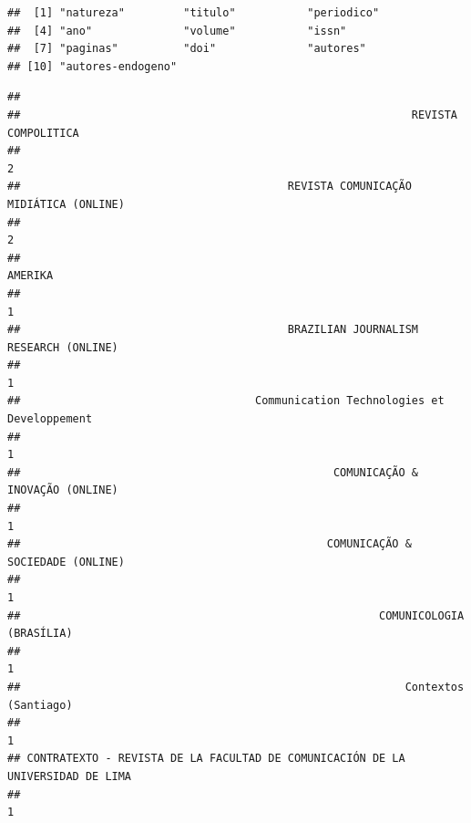 \documentclass[]{article}
\newenvironment{Shaded}{\begin{snugshade}}{\end{snugshade}}
\newcommand{\KeywordTok}[1]{\textcolor[rgb]{0.13,0.29,0.53}{\textbf{#1}}}
\newcommand{\DataTypeTok}[1]{\textcolor[rgb]{0.13,0.29,0.53}{#1}}
\newcommand{\DecValTok}[1]{\textcolor[rgb]{0.00,0.00,0.81}{#1}}
\newcommand{\StringTok}[1]{\textcolor[rgb]{0.31,0.60,0.02}{#1}}
\newcommand{\OtherTok}[1]{\textcolor[rgb]{0.56,0.35,0.01}{#1}}
\newcommand{\OperatorTok}[1]{\textcolor[rgb]{0.81,0.36,0.00}{\textbf{#1}}}
\newcommand{\NormalTok}[1]{#1}
\begin{document}
\begin{Shaded}
\end{Shaded}

\begin{verbatim}
##  [1] "natureza"         "titulo"           "periodico"       
##  [4] "ano"              "volume"           "issn"            
##  [7] "paginas"          "doi"              "autores"         
## [10] "autores-endogeno"
\end{verbatim}

\begin{Shaded}
\end{Shaded}

\begin{verbatim}
## 
##                                                            REVISTA COMPOLITICA 
##                                                                              2 
##                                         REVISTA COMUNICAÇÃO MIDIÁTICA (ONLINE) 
##                                                                              2 
##                                                                        AMERIKA 
##                                                                              1 
##                                         BRAZILIAN JOURNALISM RESEARCH (ONLINE) 
##                                                                              1 
##                                    Communication Technologies et Developpement 
##                                                                              1 
##                                                COMUNICAÇÃO & INOVAÇÃO (ONLINE) 
##                                                                              1 
##                                               COMUNICAÇÃO & SOCIEDADE (ONLINE) 
##                                                                              1 
##                                                       COMUNICOLOGIA (BRASÍLIA) 
##                                                                              1 
##                                                           Contextos (Santiago) 
##                                                                              1 
## CONTRATEXTO - REVISTA DE LA FACULTAD DE COMUNICACIÓN DE LA UNIVERSIDAD DE LIMA 
##                                                                              1
\end{verbatim}
\end{document}
